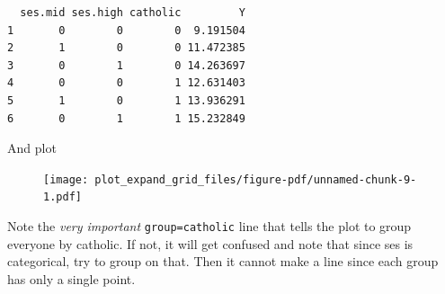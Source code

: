 \documentclass[
  letterpaper,
  DIV=11,
  numbers=noendperiod]{scrreprt}
\newenvironment{Shaded}{\begin{snugshade}}{\end{snugshade}}
\newcommand{\AttributeTok}[1]{\textcolor[rgb]{0.49,0.56,0.16}{#1}}
\newcommand{\DecValTok}[1]{\textcolor[rgb]{0.25,0.63,0.44}{#1}}
\newcommand{\FunctionTok}[1]{\textcolor[rgb]{0.02,0.16,0.49}{#1}}
\newcommand{\NormalTok}[1]{\textcolor[rgb]{0.00,0.44,0.13}{#1}}
\newcommand{\OtherTok}[1]{\textcolor[rgb]{0.00,0.44,0.13}{#1}}
\newcommand{\SpecialCharTok}[1]{\textcolor[rgb]{0.25,0.44,0.63}{#1}}
\newcommand{\StringTok}[1]{\textcolor[rgb]{0.25,0.44,0.63}{#1}}
\begin{document}
\begin{verbatim}
  ses.mid ses.high catholic         Y
1       0        0        0  9.191504
2       1        0        0 11.472385
3       0        1        0 14.263697
4       0        0        1 12.631403
5       1        0        1 13.936291
6       0        1        1 15.232849
\end{verbatim}

And plot

\begin{Shaded}
\end{Shaded}

\begin{figure}[H]

{\centering \texttt{[image: plot\_expand\_grid\_files/figure-pdf/unnamed-chunk-9-1.pdf]}

}

\end{figure}

Note the \emph{very important} \texttt{group=catholic} line that tells
the plot to group everyone by catholic. If not, it will get confused and
note that since ses is categorical, try to group on that. Then it cannot
make a line since each group has only a single point.
\end{document}
